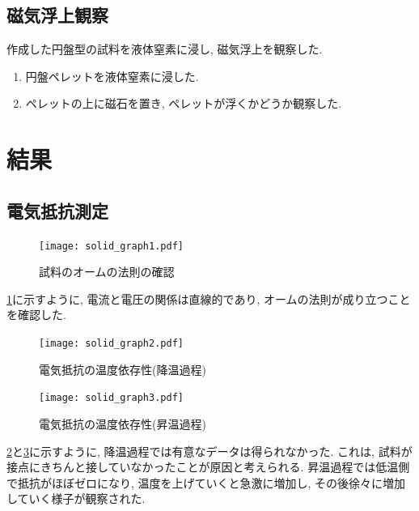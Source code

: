 \documentclass[11pt]{ltjsarticle}
\begin{document}
    \subsection*{磁気浮上観察}
      作成した円盤型の試料を液体窒素に浸し, 磁気浮上を観察した.
      \begin{enumerate}
        \item 円盤ペレットを液体窒素に浸した.
        \item ペレットの上に磁石を置き, ペレットが浮くかどうか観察した.
      \end{enumerate}
  \section*{結果}
    \subsection*{電気抵抗測定}
      \begin{figure}[H]
        \centering
        \texttt{[image: solid\_graph1.pdf]}
        \caption{試料のオームの法則の確認}
        \label{fig:ohm}
      \end{figure}
      \cref{fig:ohm}に示すように, 電流と電圧の関係は直線的であり, オームの法則が成り立つことを確認した.
      \begin{minipage}[H]{0.48\textwidth}
        \centering
        \begin{figure}[H]
          \centering
          \texttt{[image: solid\_graph2.pdf]}
          \caption{電気抵抗の温度依存性(降温過程)}
          \label{fig:resistance_cooling}
        \end{figure}
      \end{minipage}
      \begin{minipage}[H]{0.48\textwidth}
        \centering
        \begin{figure}[H]
          \centering
          \texttt{[image: solid\_graph3.pdf]}
          \caption{電気抵抗の温度依存性(昇温過程)}
          \label{fig:resistance_warming}
        \end{figure}
      \end{minipage}
      \cref{fig:resistance_cooling}と\cref{fig:resistance_warming}に示すように, 降温過程では有意なデータは得られなかった. これは, 試料が接点にきちんと接していなかったことが原因と考えられる.
      昇温過程では低温側で抵抗がほぼゼロになり, 温度を上げていくと急激に増加し, その後徐々に増加していく様子が観察された.
\end{document}
